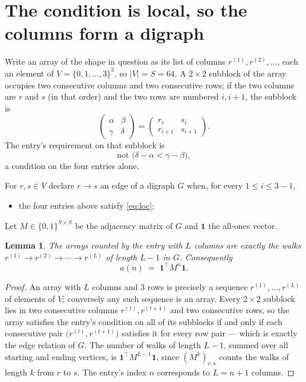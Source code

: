 \documentclass[11pt,a4paper]{article}
\theoremstyle{plain}
\newtheorem{lemma}[theorem]{Lemma}
\theoremstyle{definition}
\begin{document}
\section{The condition is local, so the columns form a digraph}

Write an array of the shape in question as its list of columns
$r^{(1)},r^{(2)},\dots$, each an element of
$V=\{0,1,\dots,3\}^{3}$, so $|V|=S=64$. A $2\times2$ subblock of the array
occupies two consecutive columns and two consecutive rows; if the two columns are $r$
and $s$ (in that order) and the two rows are numbered $i,i+1$,
the subblock is
\[
\begin{pmatrix}\alpha&\beta\\\gamma&\delta\end{pmatrix}=\begin{pmatrix}r_i&s_i\\r_{i+1}&s_{i+1}\end{pmatrix}.
\]
The entry's requirement on that subblock is
\begin{equation}\label{eq:loc}
\text{not }\bigl(\delta-\alpha<\gamma-\beta\bigr),
\end{equation}
a condition on the four entries alone.

For $r,s\in V$ declare $r\to s$ an edge of a digraph $G$ when, for every
$1\le i\le 3-1$,
\begin{itemize}
\item the four entries above satisfy \eqref{eq:loc};

\end{itemize}
Let $M\in\{0,1\}^{S\times S}$ be the adjacency matrix of $G$ and $\mathbf{1}$ the
all-ones vector.

\begin{lemma}\label{lem:walk}
The arrays counted by the entry with $L$ columns are exactly the walks
$r^{(1)}\to r^{(2)}\to\cdots\to r^{(L)}$ of length $L-1$ in $G$. Consequently
\[
a(n)\;=\;\mathbf{1}^{\!\top}M^{n}\mathbf{1} .
\]
\end{lemma}

\begin{proof}
An array with $L$ columns and $3$ rows is precisely a sequence
$r^{(1)},\dots,r^{(L)}$ of elements of $V$; conversely any such sequence is an array.
Every $2\times2$ subblock lies in two consecutive columns $r^{(t)},r^{(t+1)}$ and two
consecutive rows, so the array satisfies the entry's condition on all of its subblocks
if and only if each consecutive pair $\bigl(r^{(t)},r^{(t+1)}\bigr)$ satisfies it for
every row pair --- which is exactly the edge relation of $G$. The number of walks of
length $L-1$, summed over all starting and ending vertices, is
$\mathbf{1}^{\!\top}M^{L-1}\mathbf{1}$, since $(M^{k})_{r,s}$ counts the walks of
length $k$ from $r$ to $s$. The entry's index $n$ corresponds to $L=n+1$ columns.
\end{proof}
\end{document}
